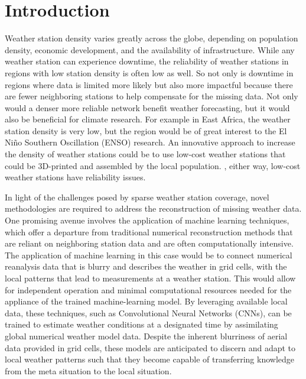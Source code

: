 \section{Introduction}
\label{sec:introduction}


Weather station density varies greatly across the globe, depending on population density, economic development, and the availability of infrastructure. \cite{ortizbobea2021} While any weather station can experience downtime, the reliability of weather stations in regions with low station density is often low as well. So not only is downtime in regions where data is limited more likely but also more impactful because there are fewer neighboring stations to help compensate for the missing data. Not only would a denser more reliable network benefit weather forecasting, but it would also be beneficial for climate research. For example in East Africa, the weather station density is very low, but the region would be of great interest to the El Niño Southern Oscillation (ENSO) research. \cite{marchant2007, muita2021} An innovative approach to increase the density of weather stations could be to use low-cost weather stations that could be 3D-printed and assembled by the local population. \cite{muita2021}, either way, low-cost weather stations have reliability issues.


In light of the challenges posed by sparse weather station coverage, novel methodologies are required to address the reconstruction of missing weather data. One promising avenue involves the application of machine learning techniques, which offer a departure from traditional numerical reconstruction methods that are reliant on neighboring station data and are often computationally intensive. The application of machine learning in this case would be to connect numerical reanalysis data that is blurry and describes the weather in grid cells, with the local patterns that lead to measurements at a weather station. This would allow for independent operation and minimal computational resources needed for the appliance of the trained machine-learning model. By leveraging available local data, these techniques, such as Convolutional Neural Networks (CNNs), can be trained to estimate weather conditions at a designated time by assimilating global numerical weather model data. Despite the inherent blurriness of aerial data provided in grid cells, these models are anticipated to discern and adapt to local weather patterns such that they become capable of transferring knowledge from the meta situation to the local situation.

